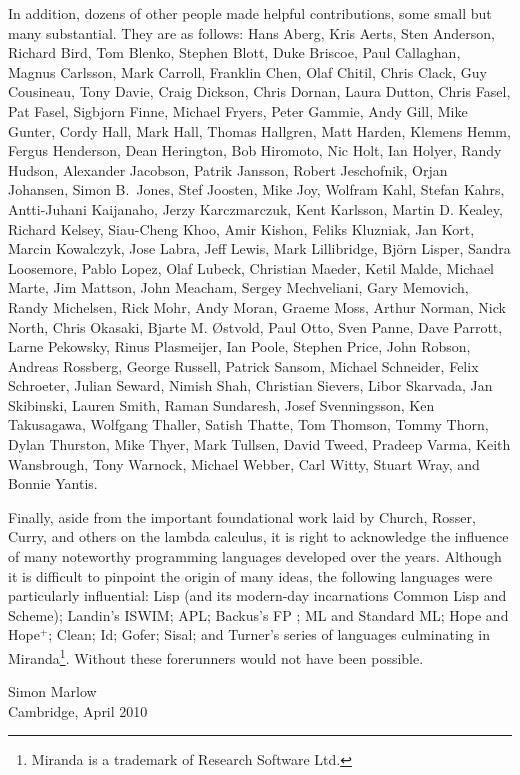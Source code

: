 In addition, dozens of other people made helpful contributions, some small but
many substantial.  They are as follows:
Hans Aberg,
Kris Aerts,
Sten Anderson,
Richard Bird,
Tom Blenko,
Stephen Blott,
Duke Briscoe,
Paul Callaghan,
Magnus Carlsson,
Mark Carroll,
Franklin Chen,
Olaf Chitil,
Chris Clack,
Guy Cousineau,
Tony Davie,
Craig Dickson,
Chris Dornan,
Laura Dutton,
Chris Fasel,
Pat Fasel, 
Sigbjorn Finne,
Michael Fryers,
Peter Gammie,
Andy Gill, 
Mike Gunter,
Cordy Hall,
Mark Hall,
Thomas Hallgren,
Matt Harden,
Klemens Hemm,
Fergus Henderson,
Dean Herington,
Bob Hiromoto,
Nic Holt,
Ian Holyer, 
Randy Hudson,
Alexander Jacobson,
Patrik Jansson,
Robert Jeschofnik,
Orjan Johansen,
Simon B.~Jones, 
Stef Joosten, 
Mike Joy,
Wolfram Kahl,
Stefan Kahrs,
Antti-Juhani Kaijanaho,
Jerzy Karczmarczuk,
Kent Karlsson,
Martin D. Kealey,
Richard Kelsey,
Siau-Cheng Khoo, 
Amir Kishon, 
Feliks Kluzniak,
Jan Kort,
Marcin Kowalczyk,
Jose Labra,
Jeff Lewis,
Mark Lillibridge,
Björn Lisper,
Sandra Loosemore,
Pablo Lopez,
Olaf Lubeck, 
Christian Maeder,
Ketil Malde,
Michael Marte,
Jim Mattson,
John Meacham,
Sergey Mechveliani,
Gary Memovich,
Randy Michelsen, 
Rick Mohr,
Andy Moran,
Graeme Moss,
Arthur Norman,
Nick North,
Chris Okasaki,
Bjarte M. {\O}stvold,
Paul Otto, 
Sven Panne,
Dave Parrott,
Larne Pekowsky,
Rinus Plasmeijer,
Ian Poole,
Stephen Price,
John Robson, 
Andreas Rossberg,
George Russell,
Patrick Sansom,
Michael Schneider,
Felix Schroeter,
Julian Seward,
Nimish Shah,
Christian Sievers,
Libor Skarvada,
Jan Skibinski,
Lauren Smith, 
Raman Sundaresh,
Josef Svenningsson,
Ken Takusagawa,
Wolfgang Thaller,
Satish Thatte,
Tom Thomson,
Tommy Thorn,
Dylan Thurston,
Mike Thyer,
Mark Tullsen,
David Tweed,
Pradeep Varma,
Keith Wansbrough,
Tony Warnock,
Michael Webber,
Carl Witty,
Stuart Wray,
and Bonnie Yantis.

Finally, aside from the important foundational work laid by Church,
Rosser, Curry, and others on the lambda calculus, it is right to
acknowledge the influence of many noteworthy programming languages
developed over the years.  Although it is difficult to pinpoint the
origin of many ideas, the following languages were particularly influential:
Lisp (and its modern-day incarnations Common Lisp and
Scheme); Landin's ISWIM; APL; Backus's FP
\cite{back78}; ML and Standard ML; Hope and Hope$^{+}$; Clean; Id; Gofer;
Sisal; and Turner's series of languages culminating in 
Miranda\footnote{{\rm Miranda} is a trademark of Research
Software Ltd.}. Without these forerunners \Haskell{} would not have
been possible.

\vspace{1in}

Simon Marlow \\
Cambridge, April 2010
